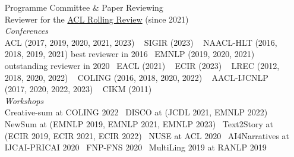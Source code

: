 \documentclass[11pt,a4paper]{article}
\begin{document}
\begin{itemize}
\begin{itemize}[
font=\normalfont\bfseries,
itemsep=.1cm,
wide=0cm,
labelsep*=.1cm]
\item[Programme Committee \& Paper Reviewing] ~\\[.2em]
  Reviewer for the \href{https://aclrollingreview.org/}{ACL Rolling Review} (since 2021)\\[.2em]
  \textit{Conferences} \\[.2em]
  \hspace*{1em} ACL (2017, 2019, 2020, 2021, 2023) ~\newline
  \hspace*{1em} SIGIR (2023) ~\newline
  \hspace*{1em} NAACL-HLT (2016, 2018, 2019, 2021) \hfill best reviewer in 2016~\newline
  \hspace*{1em} EMNLP (2019, 2020, 2021) \hfill outstanding reviewer in 2020~\newline
  \hspace*{1em} EACL (2021) ~\newline
  \hspace*{1em} ECIR (2023) ~\newline
  \hspace*{1em} LREC (2012, 2018, 2020, 2022) ~\newline
  \hspace*{1em} COLING (2016, 2018, 2020, 2022) ~\newline
  \hspace*{1em} AACL-IJCNLP (2017, 2020, 2022, 2023) ~\newline
  \hspace*{1em} CIKM (2011) \\[.5em]
  \textit{Workshops} \\[.2em]
  \hspace*{1em} Creative-sum at COLING 2022~\newline
  \hspace*{1em} DISCO at (JCDL 2021, EMNLP 2022)~\newline
  \hspace*{1em} NewSum at (EMNLP 2019, EMNLP 2021, EMNLP 2023)~\newline
  \hspace*{1em} Text2Story at (ECIR 2019, ECIR 2021, ECIR 2022)~\newline
  \hspace*{1em} NUSE at ACL 2020~\newline
  \hspace*{1em} AI4Narratives at IJCAI-PRICAI 2020~\newline
  \hspace*{1em} FNP-FNS 2020~\newline
  \hspace*{1em} MultiLing 2019 at RANLP 2019~\newline


\end{itemize}
\end{itemize}
\end{document}
